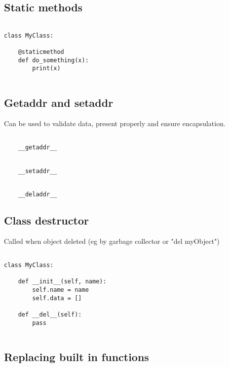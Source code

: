 \subsection{Static methods}

\begin{verbatim}

class MyClass:

    @staticmethod
    def do_something(x):
        print(x)
        
\end{verbatim}

\subsection{Getaddr and setaddr}

Can be used to validate data, present properly and ensure encapsulation.

\begin{verbatim}

    __getaddr__

\end{verbatim}

\begin{verbatim}

    __setaddr__

\end{verbatim}
 
\begin{verbatim}

    __deladdr__

\end{verbatim}

\subsection{Class destructor}

Called when object deleted (eg by garbage collector or "del myObject")

\begin{verbatim}

class MyClass:

    def __init__(self, name):
        self.name = name
        self.data = []

    def __del__(self):
        pass
        
\end{verbatim}

\subsection{Replacing built in functions}

